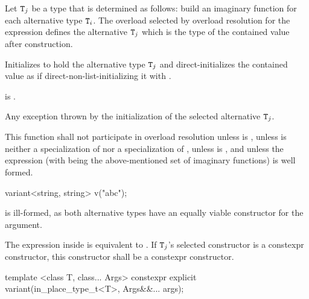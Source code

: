 \begin{itemdescr}
\pnum
Let $\texttt{T}_j$ be a type that is determined as follows:
build an imaginary function  for each alternative type $\texttt{T}_i$. The overload  selected by overload
resolution for the expression  defines
the alternative $\texttt{T}_j$ which is the type of the contained value after
construction.

\pnum
\effects
Initializes  to hold the alternative type $\texttt{T}_j$ and
direct-initializes the contained value as if direct-non-list-initializing it
with .

\pnum
\postconditions
{} is .

\pnum
\throws
Any exception thrown by the initialization of the selected alternative $\texttt{T}_j$.

\pnum
\remarks
This function shall not participate in overload resolution unless
 is ,
unless  is neither
a specialization of 
nor a specialization of ,
unless  is ,
and unless the expression
\brk{} (with 
being the above-mentioned set of imaginary functions) is well formed.

\pnum
\begin{note}
\begin{codeblock}
variant<string, string> v("abc");
\end{codeblock}
is ill-formed, as both alternative types have an equally viable constructor
for the argument. \end{note}

\pnum
The expression inside  is equivalent to
.
If $\texttt{T}_j$'s selected constructor is a constexpr constructor,
this constructor shall be a constexpr constructor.
\end{itemdescr}

%
\begin{itemdecl}
template <class T, class... Args> constexpr explicit variant(in_place_type_t<T>, Args&&... args);
\end{itemdecl}

